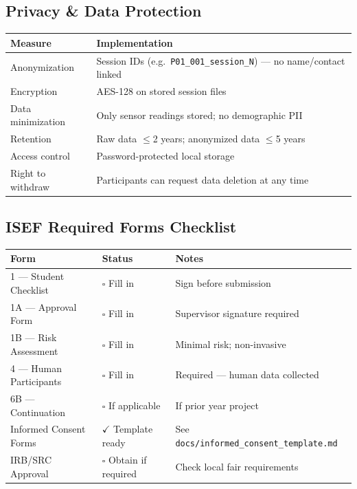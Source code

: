 \documentclass[12pt,a4paper]{article}
\begin{document}
\subsection{Privacy \& Data Protection}
\begin{center}
\begin{tabular}{@{}p{3.5cm} p{10cm}@{}}
\toprule
\textbf{Measure} & \textbf{Implementation} \\
\midrule
Anonymization   & Session IDs (e.g.\ \texttt{P01\_001\_session\_N}) --- no name/contact linked \\
Encryption      & AES-128 on stored session files \\
Data minimization & Only sensor readings stored; no demographic PII \\
Retention       & Raw data $\leq$2 years; anonymized data $\leq$5 years \\
Access control  & Password-protected local storage \\
Right to withdraw & Participants can request data deletion at any time \\
\bottomrule
\end{tabular}
\end{center}

\subsection{ISEF Required Forms Checklist}
\begin{center}
\begin{tabular}{@{}p{5cm} p{2cm} p{6cm}@{}}
\toprule
\textbf{Form} & \textbf{Status} & \textbf{Notes} \\
\midrule
1 --- Student Checklist   & $\square$ Fill in & Sign before submission \\
1A --- Approval Form      & $\square$ Fill in & Supervisor signature required \\
1B --- Risk Assessment    & $\square$ Fill in & Minimal risk; non-invasive \\
4 --- Human Participants  & $\square$ Fill in & Required --- human data collected \\
6B --- Continuation       & $\square$ If applicable & If prior year project \\
Informed Consent Forms    & $\checkmark$ Template ready & See \texttt{docs/informed\_consent\_template.md} \\
IRB/SRC Approval          & $\square$ Obtain if required & Check local fair requirements \\
\bottomrule
\end{tabular}
\end{center}
\end{document}
